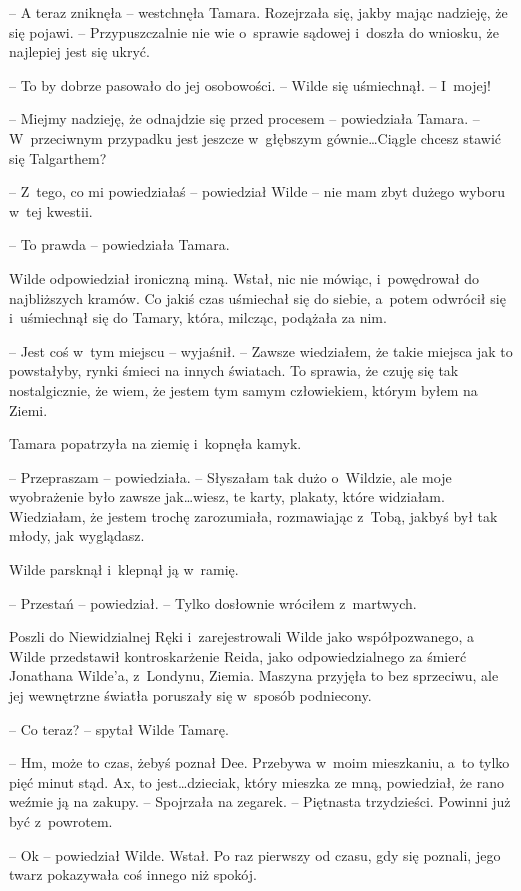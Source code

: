 \documentclass[oneside,polish,11pt,sfheadings]{mwbk}
\begin{document}
-- A teraz zniknęła -- westchnęła Tamara. Rozejrzała się, jakby mając
nadzieję, że się pojawi. -- Przypuszczalnie nie wie o~sprawie sądowej i~doszła do wniosku, że najlepiej jest się ukryć.

-- To by dobrze pasowało do jej osobowości. -- Wilde się uśmiechnął. -- I~mojej!

-- Miejmy nadzieję, że odnajdzie się przed procesem -- powiedziała Tamara.
-- W~przeciwnym przypadku jest jeszcze w~głębszym gównie\ldots Ciągle chcesz
stawić się Talgarthem?

-- Z~tego, co mi powiedziałaś -- powiedział Wilde -- nie mam zbyt dużego
wyboru w~tej kwestii.

-- To prawda -- powiedziała Tamara.

Wilde odpowiedział ironiczną miną. Wstał, nic nie mówiąc, i~powędrował
do najbliższych kramów. Co jakiś czas uśmiechał się do siebie, a~potem
odwrócił się i~uśmiechnął się do Tamary, która, milcząc, podążała za
nim.

-- Jest coś w~tym miejscu -- wyjaśnił. -- Zawsze wiedziałem, że takie
miejsca jak to powstałyby, rynki śmieci na innych światach. To sprawia,
że czuję się tak nostalgicznie, że wiem, że jestem tym samym
człowiekiem, którym byłem na Ziemi.

Tamara popatrzyła na ziemię i~kopnęła kamyk.

-- Przepraszam -- powiedziała. -- Słyszałam tak dużo o~Wildzie, ale moje
wyobrażenie było zawsze jak\ldots wiesz, te karty, plakaty, które
widziałam. Wiedziałam, że jestem trochę zarozumiała, rozmawiając z~Tobą,
jakbyś był tak młody, jak wyglądasz.

Wilde parsknął i~klepnął ją w~ramię. 

-- Przestań -- powiedział. -- Tylko
dosłownie wróciłem z~martwych.

Poszli do Niewidzialnej Ręki i~zarejestrowali Wilde jako współpozwanego,
a Wilde przedstawił kontroskarżenie Reida, jako odpowiedzialnego za
śmierć Jonathana Wilde'a, z~Londynu, Ziemia. Maszyna przyjęła to bez
sprzeciwu, ale jej wewnętrzne światła poruszały się w~sposób podniecony.

-- Co teraz? -- spytał Wilde Tamarę.

-- Hm, może to czas, żebyś poznał Dee. Przebywa w~moim mieszkaniu, a~to
tylko pięć minut stąd. Ax, to jest\ldots dzieciak, który mieszka ze mną,
powiedział, że rano weźmie ją na zakupy. -- Spojrzała na zegarek. -- Piętnasta trzydzieści. Powinni już być z~powrotem.

-- Ok -- powiedział Wilde. Wstał. Po raz pierwszy od czasu, gdy się
poznali, jego twarz pokazywała coś innego niż spokój.
\end{document}
